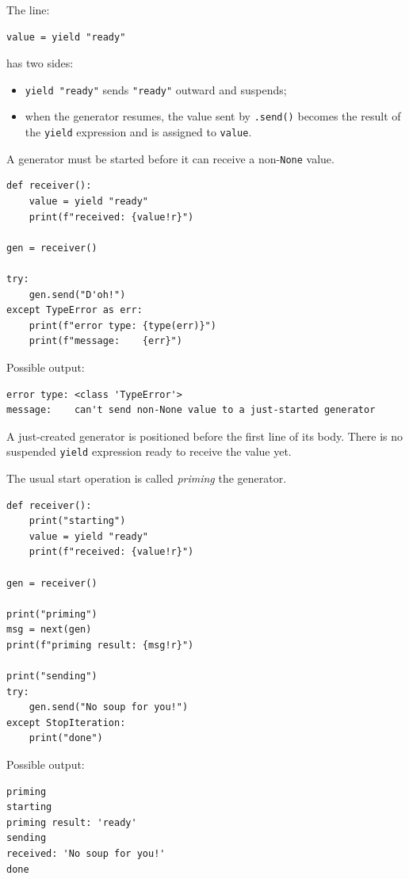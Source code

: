 The line:

\begin{verbatim}
value = yield "ready"
\end{verbatim}

has two sides:

\begin{itemize}
    \item \texttt{yield "ready"} sends \texttt{"ready"} outward and suspends;
    \item when the generator resumes, the value sent by \texttt{.send()} becomes the result of the \texttt{yield} expression and is assigned to \texttt{value}.
\end{itemize}

A generator must be started before it can receive a non-\texttt{None} value.

\begin{verbatim}
def receiver():
    value = yield "ready"
    print(f"received: {value!r}")

gen = receiver()

try:
    gen.send("D'oh!")
except TypeError as err:
    print(f"error type: {type(err)}")
    print(f"message:    {err}")
\end{verbatim}

Possible output:

\begin{verbatim}
error type: <class 'TypeError'>
message:    can't send non-None value to a just-started generator
\end{verbatim}

A just-created generator is positioned before the first line of its body. There is no suspended \texttt{yield} expression ready to receive the value yet.

The usual start operation is called \textit{priming} the generator.

\begin{verbatim}
def receiver():
    print("starting")
    value = yield "ready"
    print(f"received: {value!r}")

gen = receiver()

print("priming")
msg = next(gen)
print(f"priming result: {msg!r}")

print("sending")
try:
    gen.send("No soup for you!")
except StopIteration:
    print("done")
\end{verbatim}

Possible output:

\begin{verbatim}
priming
starting
priming result: 'ready'
sending
received: 'No soup for you!'
done
\end{verbatim}

